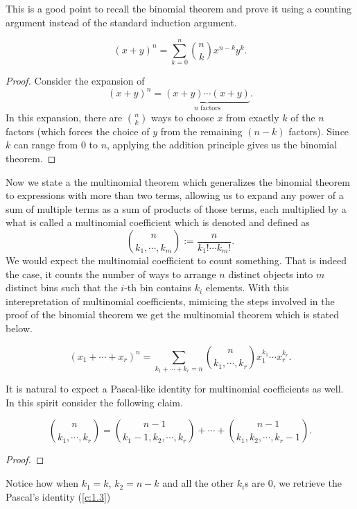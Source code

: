 This is a good point to recall the binomial theorem and prove it using a counting argument instead of the standard induction argument.

\begin{theorem}
	\[
		\left( x+y \right)^n = \sum_{k=0}^{n}\binom{n}{k}x^{n-k}y^k
	.\] 
\end{theorem}
\begin{proof}
	Consider the expansion of
	\[
		\left( x+y \right)^n = \underbrace{\left( x+y \right) \cdots \left( x+y \right) }_{n \text{ factors}}.
	\]
	In this expansion, there are $\binom{n}{k}$ ways to choose $x$ from exactly $k$ of the $n$ factors (which forces the choice of $y$ from the remaining $(n-k)$ factors). Since $k$ can range from $0$ to $n$, applying the addition principle gives us the binomial theorem.
\end{proof}
Now we state a the multinomial theorem which generalizes the binomial theorem to expressions with more than two terms, allowing us to expand any power of a sum of multiple terms as a sum of products of those terms, each multiplied by a what is called a multinomial coefficient which is denoted and defined as
\[\binom{n}{k_1,\cdots,k_m} := \frac{n}{k_1!\cdots k_m!}.\]
We would expect the multinomial coefficient to count something. That is indeed the case, it counts the number of ways to arrange $n$ distinct objects into $m$ distinct bins such that the $i$-th bin contains $k_i$ elements. With this interepretation of multinomial coefficients, mimicing the steps involved in the proof of the binomial theorem we get the multinomial theorem which is stated below. 
\begin{theorem}
	\[
	(x_{1}+\cdots+x_{r})^n = \sum_{k_{1}+\cdots+k_{r}=n}\binom{n}{k_{1},\cdots,k_{r}}x_{1}^{k_{1}}\cdots x_{r}^{k_{r}}
	.\] 
\end{theorem}
It is natural to expect a Pascal-like identity for multinomial coefficients as well. In this spirit consider the following claim.
\begin{claim}
	\[
		\binom{n}{k_{1},\cdots,k_{r}} = \binom{n-1}{k_1-1,k_2,\cdots,k_r} + \cdots + \binom{n-1}{k_1,k_2,\cdots,k_r-1}
	.\]
\end{claim}
\begin{proof}
\end{proof}
Notice how when $k_1=k$, $k_2=n-k$ and all the other $k_i$s are $0$, we retrieve the Pascal's identity (\cref{c:1.3})
